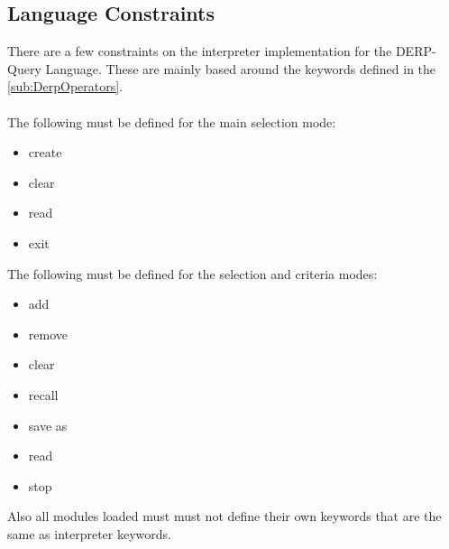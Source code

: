 \subsection{Language Constraints}
There are a few constraints on the interpreter implementation for the DERP-Query Language. These are mainly based around the keywords defined in the \autoref{sub:DerpOperators}.\\
\\The following must be defined for the main selection mode:

\begin{itemize}
    \item create 
    \item clear
    \item read
    \item exit 
\end{itemize}

\noindent The following must be defined for the selection and criteria modes:

\begin{itemize}
    \item add
    \item remove
    \item clear
    \item recall
    \item save as
    \item read
    \item stop
\end{itemize}

\noindent Also all modules loaded must must not define their own keywords that are the same as interpreter keywords.
